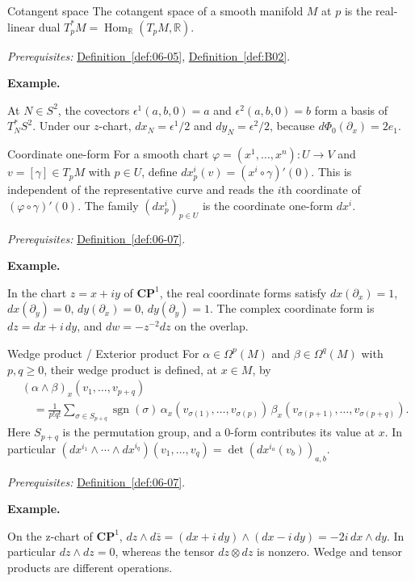 \documentclass[11pt]{article}
\makeatletter
\newcommand{\R}{\mathbb R}
\newcounter{definition}
\newcommand{\CP}{\mathbf{CP}}
\newcommand{\exampleheading}{\par\medskip\textbf{Example.}\par\smallskip}
\newcommand{\currentdefinition}[1]{\protected@edef\@currentlabel{#1}}
\makeatother
\begin{document}
\begin{definitionbox}{Cotangent space}
\currentdefinition{\thedefinition}
\label{def:06-06}
The cotangent space of a smooth manifold $M$ at $p$ is the real-linear dual $T_p^*M=\operatorname{Hom}_{\R}(T_pM,\R)$.

\smallskip
\textit{Prerequisites:} \hyperref[def:06-05]{Definition~\ref*{def:06-05}}, \hyperref[def:B02]{Definition~\ref*{def:B02}}.

\exampleheading
At $N\in S^2$, the covectors $\epsilon^1(a,b,0)=a$ and $\epsilon^2(a,b,0)=b$ form a basis of $T_N^*S^2$. Under our $z$-chart, $dx_N=\epsilon^1/2$ and $dy_N=\epsilon^2/2$, because $d\Phi_0(\partial_x)=2e_1$.
\end{definitionbox}

\begin{definitionbox}{Coordinate one-form}
\currentdefinition{\thedefinition}
\label{def:06-08}
For a smooth chart $\varphi=(x^1,\ldots,x^n):U\to V$ and $v=[\gamma]\in T_pM$ with $p\in U$, define $dx_p^i(v)=(x^i\circ\gamma)'(0)$. This is independent of the representative curve and reads the $i$th coordinate of $(\varphi\circ\gamma)'(0)$. The family $(dx_p^i)_{p\in U}$ is the coordinate one-form $dx^i$.

\smallskip
\textit{Prerequisites:} \hyperref[def:06-07]{Definition~\ref*{def:06-07}}.

\exampleheading
In the chart $z=x+iy$ of $\CP^1$, the real coordinate forms satisfy $dx(\partial_x)=1$, $dx(\partial_y)=0$, $dy(\partial_x)=0$, $dy(\partial_y)=1$. The complex coordinate form is $dz=dx+i\,dy$, and $dw=-z^{-2}dz$ on the overlap.
\end{definitionbox}

\begin{definitionbox}{Wedge product / Exterior product}
\currentdefinition{\thedefinition}
\label{def:06-09}
For $\alpha\in\Omega^p(M)$ and $\beta\in\Omega^q(M)$ with $p,q\ge0$, their wedge product is defined, at $x\in M$, by
\begin{align*}
&(\alpha\wedge\beta)_x(v_1,\ldots,v_{p+q})\\
&\quad=\frac1{p!q!}\sum_{\sigma\in S_{p+q}}\operatorname{sgn}(\sigma)\,
\alpha_x(v_{\sigma(1)},\ldots,v_{\sigma(p)})\,
\beta_x(v_{\sigma(p+1)},\ldots,v_{\sigma(p+q)}).
\end{align*}
Here $S_{p+q}$ is the permutation group, and a $0$-form contributes its value at $x$. In particular $(dx^{i_1}\wedge\cdots\wedge dx^{i_q})(v_1,\ldots,v_q)=\det(dx^{i_a}(v_b))_{a,b}$.

\smallskip
\textit{Prerequisites:} \hyperref[def:06-07]{Definition~\ref*{def:06-07}}.

\exampleheading
On the z-chart of $\CP^1$, $dz\wedge d\bar z=(dx+i\,dy)\wedge(dx-i\,dy)=-2i\,dx\wedge dy$. In particular $dz\wedge dz=0$, whereas the tensor $dz\otimes dz$ is nonzero. Wedge and tensor products are different operations.
\end{definitionbox}
\end{document}
